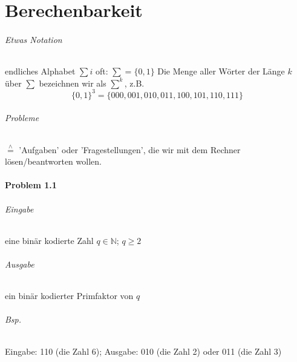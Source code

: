 \part{Berechenbarkeit}


\paragraph*{Etwas Notation} endliches Alphabet $\sum i$ oft: $\sum = \{ 0,1 \}$ Die Menge aller Wörter der Länge $k$ über $\sum$ bezeichnen wir als $\sum\limits^k$, z.B.  $$ \{ 0,1 \}^3 = \{ 000,001,010,011,100,101,110,111 \} $$

\paragraph*{Probleme} $\overset{\wedge}{=}$ 'Aufgaben' oder 'Fragestellungen', die wir mit dem Rechner lösen/beantworten wollen.


\subsection*{Problem 1.1}
\paragraph*{Eingabe} eine binär kodierte Zahl $q \in \mathbb{N}$; $q \geq 2$

\paragraph*{Ausgabe} ein binär kodierter Primfaktor von $q$

\paragraph*{Bsp.} Eingabe: 110 (die Zahl 6); Ausgabe: 010 (die Zahl 2) oder 011 (die Zahl 3)



